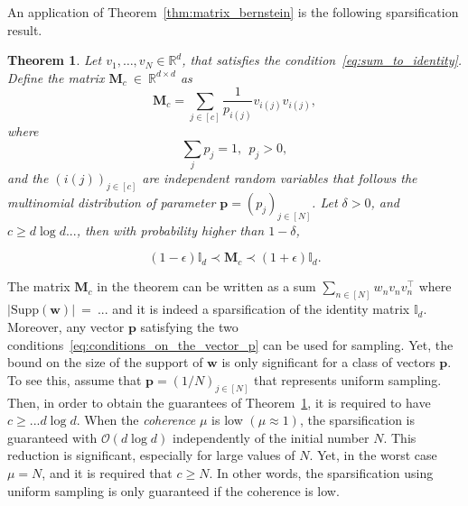 \documentclass[twoside,11pt]{book}
\newtheorem{theorem}{Theorem}
\DeclareMathOperator{\Tran}{\intercal}
\begin{document}


An application of Theorem~\ref{thm:matrix_bernstein} is the following sparsification result.

\begin{theorem}\label{thm:matrix_bernstein_identity_sparsification}
Let $v_{1}, \dots, v_{N} \in \mathbb{R}^{d}$, that satisfies the condition~\eqref{eq:sum_to_identity}. Define the matrix $\bm{M}_{c}~\in~\mathbb{R}^{d\times d}$ as
\begin{equation}
\bm{M}_{c} = \sum\limits_{j \in [c]} \frac{1}{p_{i(j)}}v_{i(j)}v_{i(j)},
\end{equation} 
where
\begin{equation}\label{eq:conditions_on_the_vector_p}
\sum\limits_{j} p_{j} = 1, \:\: p_{j}>0,
\end{equation}
and the $(i(j))_{j \in [c]}$ are independent random variables that follows the multinomial distribution of parameter $\bm{p} = (p_{j})_{j \in [N]}$. Let $\delta >0$, and $c \geq d \log d ...$, then with probability higher than $1-\delta$,

\begin{equation}
 (1-\epsilon) \mathbb{I}_{d} \prec \bm{M}_{c} \prec (1+\epsilon) \mathbb{I}_{d}.
\end{equation}

\end{theorem}

The matrix $\bm{M}_{c}$ in the theorem can be written as a sum $\displaystyle \sum\limits_{n \in [N]}w_{n}v_{n}v_{n}^{\Tran}$ where $|\mathrm{Supp}(\bm{w})|~=~...$ and it is indeed a sparsification of the identity matrix $\mathbb{I}_{d}$. Moreover, any vector $\bm{p}$ satisfying the two conditions~\eqref{eq:conditions_on_the_vector_p} can be used for sampling. Yet, the bound on the size of the support of $\bm{w}$ is only significant for a class of vectors $\bm{p}$. To see this, assume that $\bm{p} = (1/N)_{j \in [N]}$ that represents uniform sampling. Then, in order to obtain the guarantees of Theorem~\ref{thm:matrix_bernstein_identity_sparsification}, it is required to have  $c \geq ... d \log d $. When the \emph{coherence} $\mu$ is low $(\mu \approx 1)$, the sparsification is guaranteed with $\mathcal{O}(d \log d)$ independently of the initial number $N$. This reduction is significant, especially for large values of $N$. Yet, in the worst case $\mu = N$, and it is required that $c \geq N$. In other words, the sparsification using uniform sampling is only guaranteed if the coherence is low.
\end{document}
